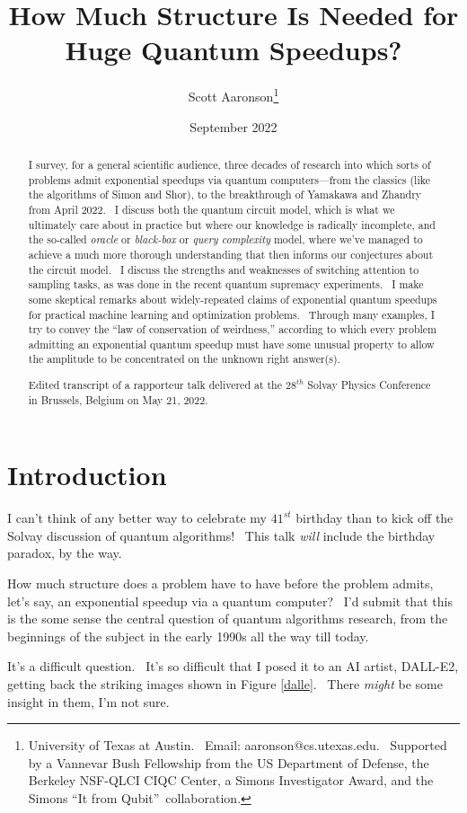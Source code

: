 \documentclass[12pt]{article}
\title{How Much Structure Is Needed for Huge Quantum Speedups?}
\author{Scott Aaronson\thanks{University of Texas at Austin. \ Email:
aaronson@cs.utexas.edu. \ Supported by a Vannevar Bush Fellowship from the US
Department of Defense, the Berkeley NSF-QLCI CIQC Center, a Simons Investigator Award, and the Simons
\textquotedblleft It from Qubit\textquotedblright\ collaboration.}}
\date{September 2022}
\begin{document}
\maketitle

\begin{abstract}
I survey, for a general scientific audience, three decades of research into
which sorts of problems admit exponential speedups via quantum
computers---from the classics (like the algorithms of Simon and
Shor), to the breakthrough of Yamakawa and
Zhandry from April 2022. \ I discuss both the quantum circuit model,
which is what we ultimately care about in practice but where our
knowledge is radically incomplete, and the so-called \emph{oracle} or
\emph{black-box} or \emph{query complexity} model, where we've managed to
achieve a much more thorough understanding that then informs our
conjectures about the circuit model. \ I discuss the strengths and
weaknesses of switching attention to sampling tasks, as was done in
the recent quantum supremacy experiments. \ I make some
skeptical remarks about widely-repeated claims of exponential quantum
speedups for practical machine learning and optimization problems. \
Through many examples, I try to convey the ``law of conservation
of weirdness,'' according to which every problem admitting an exponential
quantum speedup must have some unusual property to allow the amplitude
to be concentrated on the unknown right answer(s).

Edited transcript of a rapporteur talk delivered at the $28^{th}$ Solvay Physics Conference in Brussels, Belgium on May 21, 2022.
\end{abstract}

\newpage

\section{Introduction}

I can't think of any better way to celebrate my $41^{st}$ birthday than to kick off the Solvay discussion of quantum algorithms! \ This talk \emph{will} include the birthday paradox, by the way.

How much structure does a problem have to have before the problem admits, let's say, an exponential speedup via a quantum computer? \ I'd submit that this is the some sense the central question of quantum algorithms research, from the beginnings of the subject in the early 1990s all the way till today.

It's a difficult question. \ It's so difficult that I posed it to an AI artist, DALL-E2, getting back the striking images shown in Figure \ref{dalle}. \ There \emph{might} be some insight in them, I'm not sure.
\end{document}
